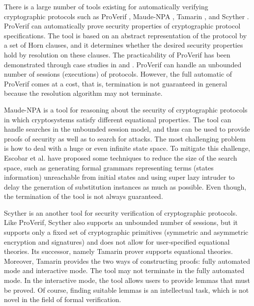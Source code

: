 \documentclass[a4paper,fleqn]{cas-dc}
\begin{document}
There is a large number of tools existing for automatically verifying cryptographic protocols such as ProVerif \cite{proverif}, Maude-NPA \cite{maudenpa}, Tamarin \cite{tamarin}, and Scyther \cite{Scyther08}.
ProVerif can automatically prove security properties of cryptographic protocol specifications.
The tool is based on an abstract representation of the protocol by a set of Horn clauses,
and it determines whether the desired security properties hold by resolution on these clauses.
The practicability of ProVerif has been demonstrated through case studies in \cite{proverif2} and \cite{proverif3}. 
ProVerif can handle an unbounded number of sessions (executions) of protocols. 
However, the full automatic of ProVerif comes at a cost, that is, termination is not guaranteed in general because the resolution algorithm may not terminate. 

Maude-NPA \cite{maudenpa} is a tool for reasoning about the security of cryptographic protocols in which cryptosystems satisfy different equational properties.
The tool can handle searches in the unbounded session model, and thus can be used to provide proofs of security as well as to search for attacks.
The most challenging problem is how to deal with a huge or even infinite state space.
To mitigate this challenge, Escobar et al. \cite{maudenpa08} have proposed some techniques to reduce the size of the search space, such as generating formal grammars representing terms (states information) unreachable from initial states and using super lazy intruder to delay the generation of substitution instances as much as possible.
Even though, the termination of the tool is not always guaranteed.

Scyther \cite{Scyther08} is an another tool for security verification of cryptographic protocols.
Like ProVerif, Scyther also supports an unbounded number of sessions, but it supports only a fixed set of cryptographic primitives (symmetric and asymmetric encryption and signatures) and does not allow for user-specified equational theories.
Its successor, namely Tamarin prover \cite{tamarin} supports equational theories.
Moreover, Tamarin  provides the two ways of constructing proofs: fully automated mode and interactive mode. 
The tool may not terminate in the fully automated mode.
In the interactive mode, the tool allows users to provide lemmas that must be proved. 
Of course, finding suitable lemmas is an intellectual task, which is not novel in the field of formal verification.
\end{document}
